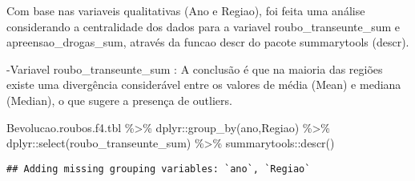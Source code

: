 \documentclass[
]{article}
\newenvironment{Shaded}{\begin{snugshade}}{\end{snugshade}}
\newcommand{\FunctionTok}[1]{\textcolor[rgb]{0.00,0.00,0.00}{#1}}
\newcommand{\NormalTok}[1]{#1}
\newcommand{\SpecialCharTok}[1]{\textcolor[rgb]{0.00,0.00,0.00}{#1}}
\begin{document}
Com base nas variaveis qualitativas (Ano e Regiao), foi feita uma análise considerando a centralidade dos dados para a variavel roubo\_transeunte\_sum e apreensao\_drogas\_sum, através da funcao descr do pacote summarytools (descr).

-Variavel roubo\_transeunte\_sum : A conclusão é que na maioria das regiões existe uma divergência considerável entre os valores de média (Mean) e mediana (Median), o que sugere a presença de outliers.

\begin{Shaded}
\begin{Highlighting}[]
\NormalTok{Bevolucao.roubos.f4.tbl }\SpecialCharTok{\%\textgreater{}\%}\NormalTok{ dplyr}\SpecialCharTok{::}\FunctionTok{group\_by}\NormalTok{(ano,Regiao) }\SpecialCharTok{\%\textgreater{}\%}\NormalTok{ dplyr}\SpecialCharTok{::}\FunctionTok{select}\NormalTok{(roubo\_transeunte\_sum) }\SpecialCharTok{\%\textgreater{}\%}\NormalTok{ summarytools}\SpecialCharTok{::}\FunctionTok{descr}\NormalTok{()}
\end{Highlighting}
\end{Shaded}

\begin{verbatim}
## Adding missing grouping variables: `ano`, `Regiao`
\end{verbatim}
\end{document}
